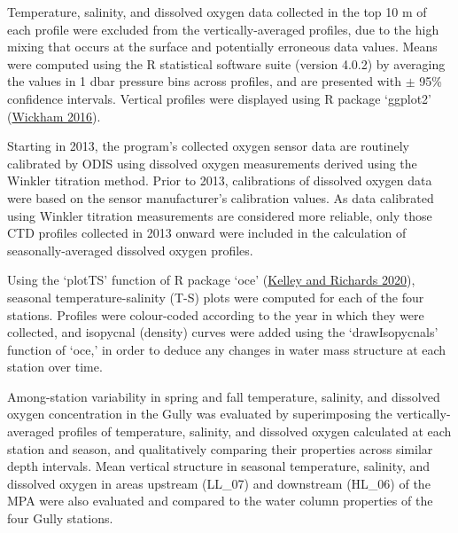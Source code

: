 \documentclass[12pt]{article}\usepackage[]{graphicx}\usepackage[]{color}
\begin{document}
Temperature, salinity, and dissolved oxygen data collected in the top 10 m of each profile were excluded from the vertically-averaged profiles, due to the high mixing that occurs at the surface and potentially erroneous data values. Means were computed using the R statistical software suite (version 4.0.2) by averaging the values in 1 dbar pressure bins across profiles, and are presented with \(\pm\) 95\% confidence intervals. Vertical profiles were displayed using R package `ggplot2' (\protect\hyperlink{ref-wickham_2016}{Wickham 2016}).

Starting in 2013, the program's collected oxygen sensor data are routinely calibrated by ODIS using dissolved oxygen measurements derived using the Winkler titration method. Prior to 2013, calibrations of dissolved oxygen data were based on the sensor manufacturer's calibration values. As data calibrated using Winkler titration measurements are considered more reliable, only those CTD profiles collected in 2013 onward were included in the calculation of seasonally-averaged dissolved oxygen profiles.

Using the `plotTS' function of R package `oce' (\protect\hyperlink{ref-kelley_2020}{Kelley and Richards 2020}), seasonal temperature-salinity (T-S) plots were computed for each of the four stations. Profiles were colour-coded according to the year in which they were collected, and isopycnal (density) curves were added using the `drawIsopycnals' function of `oce,' in order to deduce any changes in water mass structure at each station over time.

Among-station variability in spring and fall temperature, salinity, and dissolved oxygen concentration in the Gully was evaluated by superimposing the vertically-averaged profiles of temperature, salinity, and dissolved oxygen calculated at each station and season, and qualitatively comparing their properties across similar depth intervals. Mean vertical structure in seasonal temperature, salinity, and dissolved oxygen in areas upstream (LL\_07) and downstream (HL\_06) of the MPA were also evaluated and compared to the water column properties of the four Gully stations.
\end{document}
